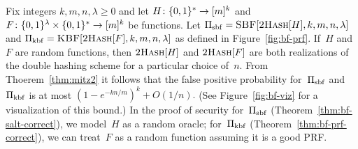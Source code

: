 Fix integers $k,m,n,\lambda \geq 0$ and let $H \colon \{0,1\}^* \to [m]^k$ and $F
\colon \{0,1\}^\lambda\times\{0,1\}^*\to[m]^k$ be functions.
%
Let $\mathrm{\Pi}_{\mathrm{sbf}} = \textsc{SBF}[\textsc{2Hash}[H],k,m,n,\lambda]$ and $\mathrm{\Pi}_{\mathrm{kbf}} =
\textsc{KBF}[\textsc{2Hash}[F],k,m,n,\lambda]$ as defined in Figure~\ref{fig:bf-prf}.
%
If~$H$ and~$F$ are random functions, then $\textsc{2Hash}[H]$ and $\textsc{2Hash}[F]$ are
both realizations of the double hashing scheme for a particular choice of~$n$.
%
From Thoerem~\ref{thm:mitz2} it follows that the false positive probability
for~$\mathrm{\Pi}_{\mathrm{sbf}}$ and~$\mathrm{\Pi}_{\mathrm{kbf}}$ is at most
$
  (1 - e^{-kn/m})^k + O(1/n).
$
(See Figure~\ref{fig:bf-viz} for a visualization of this bound.)
%
In the proof of security for~$\mathrm{\Pi}_{\mathrm{sbf}}$
(Theorem~\ref{thm:bf-salt-correct}), we model~$H$ as a random oracle;
%
for~$\mathrm{\Pi}_{\mathrm{kbf}}$ (Theorem~\ref{thm:bf-prf-correct}), we can treat~$F$ as
a random function assuming it is a good PRF.
